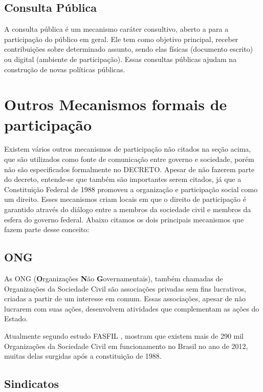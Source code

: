 \subsection*{Consulta Pública}

A consulta pública é um mecanismo caráter consultivo, aberto a para a participação do público em geral. Ele tem como objetivo principal, receber contribuições sobre determinado assunto, sendo elas físicas (documento escrito) ou digital (ambiente de participação). Essas consultas públicas ajudam na construção de novas políticas públicas.

\section{Outros Mecanismos formais de participação}

Existem vários outros mecanismos de participação não citados na seção acima, que são utilizados como fonte de comunicação entre governo e sociedade, porém não são especificados formalmente no DECRETO. Apesar de não fazerem parte do decreto, entende-se que também são importantes serem citados, já que a Constituição Federal de 1988 promoveu a organização e participação social como um direito. Esses mecanismos criam locais em que o direito de participação é garantido através do diálogo entre a membros da sociedade civil e membros da esfera do governo federal. Abaixo citamos os dois principais mecanismos que fazem parte desse conceito:

\subsection*{ONG}

As ONG (\textbf{O}rganizações \textbf{N}ão \textbf{G}overnamentais), também chamadas de Organizações da Sociedade Civil são associações privadas sem fins lucrativos, criadas a partir de um interesse em comum. Essas associações, apesar de não lucrarem com suas ações, desenvolvem atividades que complementam as ações do Estado.

Atualmente segundo estudo FASFIL \cite{ibge2012ongs}, mostram que existem mais de 290 mil Organizações da Sociedade Civil em funcionamento no Brasil no ano de 2012, muitas delas surgidas após a constituição de 1988.

\subsection*{Sindicatos}

